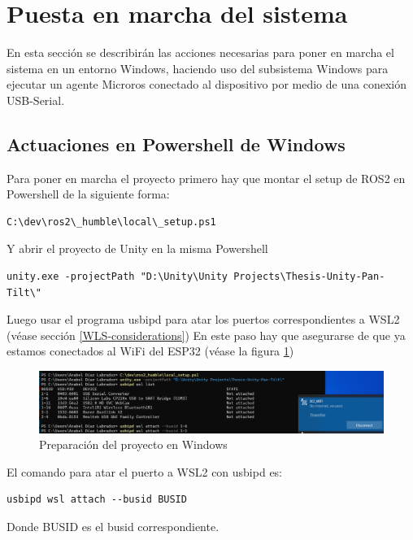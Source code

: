 \section{Puesta en marcha del sistema}

En esta sección se describirán las acciones necesarias para poner en marcha el sistema en un entorno Windows, haciendo uso del subsistema Windows para ejecutar un agente Microros conectado al dispositivo por medio de una conexión USB-Serial.


\subsection{Actuaciones en Powershell de Windows}

Para poner en marcha el proyecto primero hay que montar el setup de ROS2 en Powershell de la siguiente forma:

\begin{verbatim}
C:\dev\ros2\_humble\local\_setup.ps1
\end{verbatim}

Y abrir el proyecto de Unity en la misma Powershell

\begin{verbatim}
unity.exe -projectPath "D:\Unity\Unity Projects\Thesis-Unity-Pan-Tilt\"
\end{verbatim}

Luego usar el programa usbipd para atar los puertos correspondientes a WSL2 (véase sección \ref{WLS-considerations})
En este paso hay que asegurarse de que ya estamos conectados al WiFi del ESP32 (véase la figura \ref{figure:usbipd-in-the-lan})

\begin{figure}[!htb]
   \centering
    \includegraphics[width=0.8\linewidth]{figures/usbipd-in-the-lan.png}
   \caption{Preparación del proyecto en Windows}
   \label{figure:usbipd-in-the-lan}
\end{figure}

El comando para atar el puerto a WSL2 con usbipd es:

\begin{verbatim}
usbipd wsl attach --busid BUSID
\end{verbatim}

Donde BUSID es el busid correspondiente.

